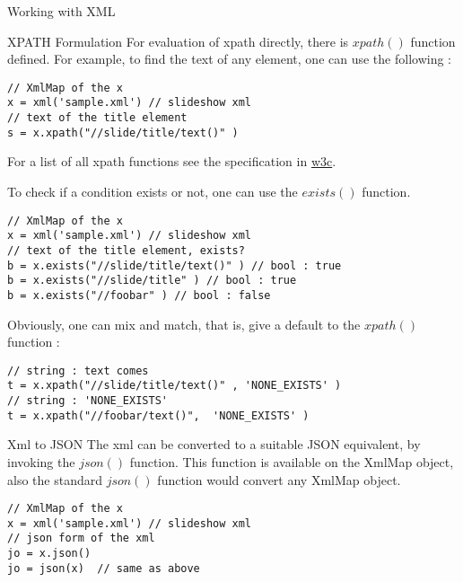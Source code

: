 \begin{section}{Working with XML}
\begin{subsection}{XPATH Formulation}
For evaluation of xpath directly, there is $xpath()$ function 
defined. For example, to find the text of any element, 
one can use the following :

\begin{lstlisting}[style=JexlStyle]
// XmlMap of the x 
x = xml('sample.xml') // slideshow xml
// text of the title element 
s = x.xpath("//slide/title/text()" )  
\end{lstlisting}

For a list of all xpath functions see the specification in 
\href{https://www.w3.org/TR/xpath-functions-3}{w3c}.

To check if a condition exists or not, one can use the $exists()$ function.
\begin{lstlisting}[style=JexlStyle]
// XmlMap of the x 
x = xml('sample.xml') // slideshow xml
// text of the title element, exists? 
b = x.exists("//slide/title/text()" ) // bool : true 
b = x.exists("//slide/title" ) // bool : true 
b = x.exists("//foobar" ) // bool : false 
\end{lstlisting}

Obviously, one can mix and match, that is, give a default to the $xpath()$ function :
\begin{lstlisting}[style=JexlStyle]
// string : text comes
t = x.xpath("//slide/title/text()" , 'NONE_EXISTS' )
// string : 'NONE_EXISTS'  
t = x.xpath("//foobar/text()",  'NONE_EXISTS' )  
\end{lstlisting}

\end{subsection}

\begin{subsection}{Xml to JSON}
The xml can be converted to a suitable JSON equivalent, by invoking the $json()$ function.
This function is available on the XmlMap object, also the standard $json()$ function 
would convert any XmlMap object.

\begin{center}\begin{minipage}{\linewidth}
\begin{lstlisting}[style=JexlStyle]
// XmlMap of the x 
x = xml('sample.xml') // slideshow xml
// json form of the xml 
jo = x.json() 
jo = json(x)  // same as above
\end{lstlisting}
\end{minipage}\end{center}
 
\end{subsection}

\end{section}

